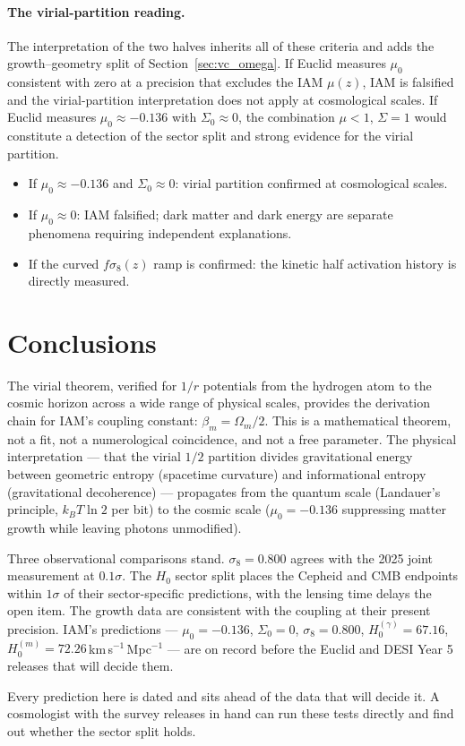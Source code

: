 \paragraph{The virial-partition reading.} The interpretation of the two halves inherits all of these criteria and adds the growth--geometry split of
Section~\ref{sec:vc_omega}. If Euclid measures $\mu_0$ consistent with zero at a precision that excludes the IAM $\mu(z)$, IAM is falsified and the
virial-partition interpretation does not apply at cosmological scales. If Euclid measures $\mu_0\approx-0.136$ with $\Sigma_0\approx0$, the combination
$\mu<1$, $\Sigma=1$ would constitute a detection of the sector split and strong evidence for the virial partition. \interp
\begin{itemize}
\item If $\mu_0\approx-0.136$ and $\Sigma_0\approx0$: virial partition confirmed at cosmological scales.
\item If $\mu_0\approx0$: IAM falsified; dark matter and dark energy are separate phenomena requiring independent explanations.
\item If the curved $f\sigma_8(z)$ ramp is confirmed: the kinetic half activation history is directly measured.
\end{itemize}

\section{Conclusions}\label{sec:vt_conclusions}
The virial theorem, verified for $1/r$ potentials from the hydrogen atom to the cosmic horizon across a wide range of physical scales, provides the
derivation chain for IAM's coupling constant: $\beta_m=\Omega_m/2$. This is a mathematical theorem, not a fit, not a numerological coincidence, and not a free
parameter. The physical interpretation --- that the virial $1/2$ partition divides gravitational energy between geometric entropy (spacetime curvature) and
informational entropy (gravitational decoherence) --- propagates from the quantum scale (Landauer's principle, $k_BT\ln2$ per bit) to the cosmic scale
($\mu_0=-0.136$ suppressing matter growth while leaving photons unmodified). \interp

Three observational comparisons stand. $\sigma_8=0.800$ agrees with the 2025 joint measurement at $0.1\sigma$. The $H_0$ sector split places the Cepheid
and CMB endpoints within $1\sigma$ of their sector-specific predictions, with the lensing time delays the open item. The growth data are consistent with
the coupling at their present precision. IAM's predictions --- $\mu_0=-0.136$, $\Sigma_0=0$, $\sigma_8=0.800$, $H_0^{(\gamma)}=67.16$,
$H_0^{(m)}=72.26$\,km\,s$^{-1}$\,Mpc$^{-1}$ --- are on record before the Euclid and DESI Year 5 releases that will decide them. \prediction

Every prediction here is dated and sits ahead of the data that will decide it. A cosmologist with the survey releases in hand can run these tests directly and find out whether the sector split holds.
